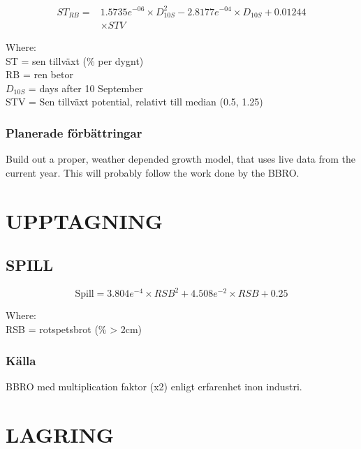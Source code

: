 \documentclass[fleqn]{article}
\begin{document}
    \begin{align}
      ST_{RB} = & 1.5735e^{-06} \times D^2_{10S} - 2.8177e^{-04} \times D_{10S} + 0.01244\\
      &\times {STV}
    \end{align}
    
    Where:\\
    \hangindent=1.5cm
    ST = sen tillväxt (\% per dygnt)\\
    RB = ren betor \\
    $D_{10S}$ = days after 10 September\\
    STV = Sen tillväxt potential, relativt till median (0.5, 1.25)

    \subsubsection{Planerade förbättringar}
    Build out a proper, weather depended growth model, that uses live data from the current year. This will probably follow the work done by the BBRO.


\pagebreak
\section{UPPTAGNING}

\subsection{SPILL}

  \begin{equation}
  \text{Spill} = 3.804e^{-4} \times RSB^2 + 4.508e^{-2} \times RSB + 0.25
  \end{equation}
  
  Where:\\
  \hangindent=1.5cm
  RSB = rotspetsbrot (\% > 2cm)\\
  
  \subsubsection{Källa}
  BBRO med multiplication faktor (x2) enligt erfarenhet inon industri.
  

\pagebreak
\section{LAGRING}
\end{document}

